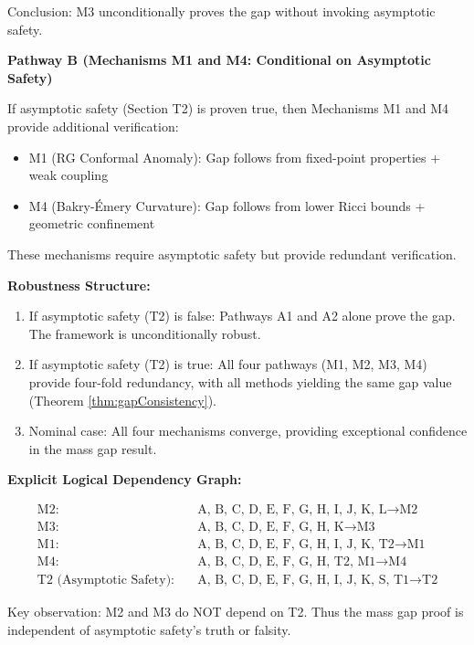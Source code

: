 \begin{remark}
Conclusion: M3 unconditionally proves the gap without invoking asymptotic safety.

\textbf{Pathway B (Mechanisms M1 and M4: Conditional on Asymptotic Safety)}

If asymptotic safety (Section T2) is proven true, then Mechanisms M1 and M4 provide additional verification:
\begin{itemize}
\item M1 (RG Conformal Anomaly): Gap follows from fixed-point properties + weak coupling
\item M4 (Bakry-Émery Curvature): Gap follows from lower Ricci bounds + geometric confinement
\end{itemize}

These mechanisms require asymptotic safety but provide redundant verification.

\textbf{Robustness Structure:}

\begin{enumerate}
\item If asymptotic safety (T2) is false: Pathways A1 and A2 alone prove the gap. The framework is unconditionally robust.
\item If asymptotic safety (T2) is true: All four pathways (M1, M2, M3, M4) provide four-fold redundancy, with all methods yielding the same gap value (Theorem \ref{thm:gapConsistency}).
\item Nominal case: All four mechanisms converge, providing exceptional confidence in the mass gap result.
\end{enumerate}

\textbf{Explicit Logical Dependency Graph:}

\begin{align}
\text{M2:} & \quad \text{A, B, C, D, E, F, G, H, I, J, K, L} \to \text{M2} \\
\text{M3:} & \quad \text{A, B, C, D, E, F, G, H, K} \to \text{M3} \\
\text{M1:} & \quad \text{A, B, C, D, E, F, G, H, I, J, K, T2} \to \text{M1} \\
\text{M4:} & \quad \text{A, B, C, D, E, F, G, H, T2, M1} \to \text{M4} \\
\text{T2 (Asymptotic Safety):} & \quad \text{A, B, C, D, E, F, G, H, I, J, K, S, T1} \to \text{T2}
\end{align}

Key observation: M2 and M3 do NOT depend on T2. Thus the mass gap proof is independent of asymptotic safety's truth or falsity.

\end{remark}

